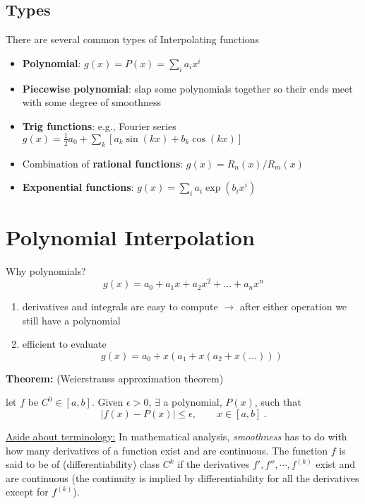 \documentclass[12pt]{article}
\begin{document}
\subsection*{Types}
There are several common types of Interpolating functions
%
\begin{itemize}
\item \textbf{Polynomial}: $g(x) = P(x) = \sum_i a_i x^i$

\item \textbf{Piecewise polynomial}: slap some polynomials together so their ends meet with some degree of smoothness

\item \textbf{Trig functions}: e.g., Fourier series $g(x) = \frac{1}{2} a_0 + \sum_k [a_k \sin(kx) + b_k \cos(kx)]$ %

\item Combination of \textbf{rational functions}: $g(x) = R_n(x)/R_m(x)$

\item \textbf{Exponential functions}: $g(x) = \sum_i a_i \exp(b_i x^i)$
\end{itemize}


\section*{Polynomial Interpolation}
Why polynomials?
\[g(x) = a_0 + a_1 x + a_2 x^2 + \dots +a_n x^n\]

\begin{enumerate}
\item derivatives and integrals are easy to compute $\rightarrow$ after either operation we still have a polynomial
\item efficient to evaluate
\[g(x) = a_0 + x(a_1 + x(a_2 + x(\dots)))\]
\end{enumerate}

\textbf{Theorem:} (Weierstrauss approximation theorem)

let $f$ be $C^0 \in [a,b]$. Given $\epsilon > 0$, $\exists$ a polynomial, $P(x)$, such that 
\[|f(x) - P(x)| \leq \epsilon, \qquad x \in [a,b] \:.\]


\begin{addmargin}[3em]{1em}
\underline{Aside about terminology:} In mathematical analysis, \textit{smoothness} has to do with how many derivatives of a function exist and are continuous. The function $f$ is said to be of (differentiability) class $C^k$ if the derivatives $f', f'', \cdots, f^{(k)}$ exist and are continuous (the continuity is implied by differentiability for all the derivatives except for $f^{(k)}$). 
\end{addmargin}%
\end{document}
